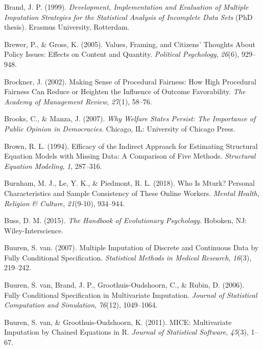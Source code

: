 \documentclass[12pt,econ]{sources/authesis}
\begin{document}
\leavevmode\hypertarget{ref-brand_1999_development}{}%
Brand, J. P. (1999). \emph{Development, Implementation and Evaluation of Multiple Imputation Strategies for the Statistical Analysis of Incomplete Data Sets} (PhD thesis). Erasmus University, Rotterdam.

\leavevmode\hypertarget{ref-brewer_values_2005}{}%
Brewer, P., \& Gross, K. (2005). Values, Framing, and Citizens' Thoughts About Policy Issues: Effects on Content and Quantity. \emph{Political Psychology}, \emph{26}(6), 929--948.

\leavevmode\hypertarget{ref-brockner_2002_making}{}%
Brockner, J. (2002). Making Sense of Procedural Fairness: How High Procedural Fairness Can Reduce or Heighten the Influence of Outcome Favorability. \emph{The Academy of Management Review}, \emph{27}(1), 58--76.

\leavevmode\hypertarget{ref-brooks_2007_welfare}{}%
Brooks, C., \& Manza, J. (2007). \emph{Why Welfare States Persist: The Importance of Public Opinion in Democracies}. Chicago, IL: University of Chicago Press.

\leavevmode\hypertarget{ref-brown_1994_efficacy}{}%
Brown, R. L. (1994). Efficacy of the Indirect Approach for Estimating Structural Equation Models with Missing Data: A Comparison of Five Methods. \emph{Structural Equation Modeling}, \emph{1}, 287--316.

\leavevmode\hypertarget{ref-burnham_2018_mturk}{}%
Burnham, M. J., Le, Y. K., \& Piedmont, R. L. (2018). Who Is Mturk? Personal Characteristics and Sample Consistency of These Online Workers. \emph{Mental Health, Religion \& Culture}, \emph{21}(9-10), 934--944.

\leavevmode\hypertarget{ref-buss_2015_handbook}{}%
Buss, D. M. (2015). \emph{The Handbook of Evolutionary Psychology}. Hoboken, NJ: Wiley-Interscience.

\leavevmode\hypertarget{ref-buuren_2007_multiple}{}%
Buuren, S. van. (2007). Multiple Imputation of Discrete and Continuous Data by Fully Conditional Specification. \emph{Statistical Methods in Medical Research}, \emph{16}(3), 219--242.

\leavevmode\hypertarget{ref-buuren_2006_fully}{}%
Buuren, S. van, Brand, J. P., Groothuis-Oudshoorn, C., \& Rubin, D. (2006). Fully Conditional Specification in Multivariate Imputation. \emph{Journal of Statistical Computation and Simulation}, \emph{76}(12), 1049--1064.

\leavevmode\hypertarget{ref-buuren_2011_mice}{}%
Buuren, S. van, \& Groothuis-Oudshoorn, K. (2011). MICE: Multivariate Imputation by Chained Equations in R. \emph{Journal of Statistical Software}, \emph{45}(3), 1--67.
\end{document}
